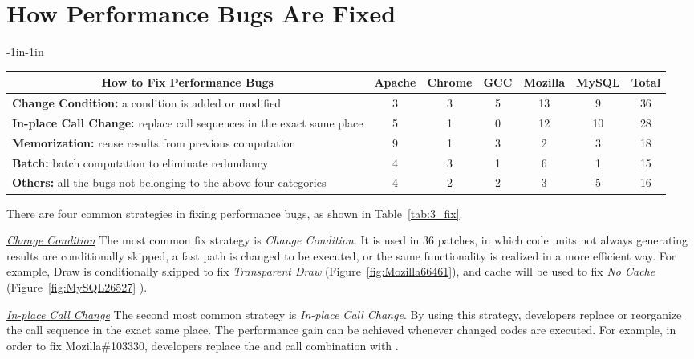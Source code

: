 \section{How Performance Bugs Are Fixed}
\label{sec:3_fix}

\begin{table*}[tb!]
\begin{adjustwidth}{-1in}{-1in}
\scriptsize
\centering
{
\begin{tabular}{lcccccc}
\toprule
\multicolumn{1}{c}{\bf How to Fix Performance Bugs} &Apache&Chrome&GCC&Mozilla&MySQL&Total\\
\midrule
\multicolumn{1}{l}{{\bf Change Condition:} {a condition is added or modified} }
&3&3&5&13&9&36\\
\midrule
\multicolumn{1}{l}{{\bf In-place Call Change:} {replace call sequences in the exact same place} }
&5&1&0&12&10&28\\
\midrule
\multicolumn{1}{l}{{\bf Memorization:} {reuse results from previous computation}}
&9&1&3&2&3&18\\
\midrule
 \multicolumn{1}{l}{{\bf Batch:} {batch computation to eliminate redundancy}}
&4&3&1&6&1&15\\
\midrule
\multicolumn{1}{l}{{\bf Others:} all the bugs not belonging to the above four categories}
&4&2&2&3&5&16\\
\bottomrule
\end{tabular}
}
\end{adjustwidth}
\caption{How to fix performance bugs in Section~\ref{sec:3_fix}}
\label{tab:3_fix}
\end{table*}

There are four common strategies in fixing performance bugs, as shown in Table~\ref{tab:3_fix}.

\underline{\it Change Condition} The most common fix strategy is {\it Change Condition}. 
It is used in 36 patches, in which code units not always generating 
results are conditionally skipped, 
a fast path is changed to be executed, or the same functionality is realized in a more efficient way. 
For example, Draw is conditionally skipped to fix {\it Transparent Draw} (Figure~\ref{fig:Mozilla66461}), 
and cache will be used to fix {\it No Cache} (Figure~\ref{fig:MySQL26527} ).

\underline{\it In-place Call Change} 
The second most common strategy is {\it In-place Call Change}. 
By using this strategy, 
developers replace or reorganize the call sequence in the exact same place. 
The performance gain can be achieved whenever changed codes are executed. 
For example, in order to fix Mozilla\#103330, 
developers replace the  and  call combination with .

